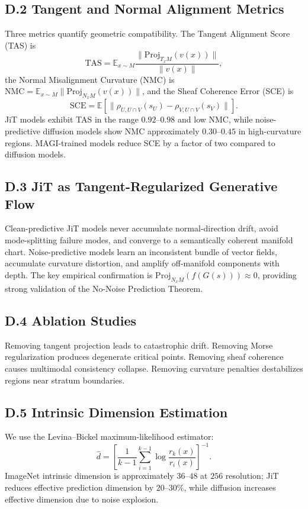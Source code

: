 \documentclass[11pt,a4paper,twocolumn]{article}
\begin{document}
\subsection*{D.2 Tangent and Normal Alignment Metrics}

Three metrics quantify geometric compatibility. The Tangent Alignment
Score (TAS) is
\[
\mathrm{TAS} =
\mathbb{E}_{x \sim M}
\frac{\| \mathrm{Proj}_{T_xM}(v(x)) \|}{\|v(x)\|},
\]
the Normal Misalignment Curvature (NMC) is
$\mathrm{NMC} = \mathbb{E}_{x \sim M}\| \mathrm{Proj}_{N_xM}(v(x)) \|$,
and the Sheaf Coherence Error (SCE) is
\[
\mathrm{SCE} =
\mathbb{E}\!\left[
\|\rho_{U,U\cap V}(s_U) - \rho_{V,U\cap V}(s_V)\|
\right].
\]
JiT models exhibit TAS in the range $0.92$--$0.98$ and low NMC, while
noise-predictive diffusion models show NMC approximately $0.30$--$0.45$
in high-curvature regions. MAGI-trained models reduce SCE by a factor
of two compared to diffusion models.

\subsection*{D.3 JiT as Tangent-Regularized Generative Flow}

Clean-predictive JiT models never accumulate normal-direction drift,
avoid mode-splitting failure modes, and converge to a semantically
coherent manifold chart. Noise-predictive models learn an inconsistent
bundle of vector fields, accumulate curvature distortion, and amplify
off-manifold components with depth. The key empirical confirmation is
$\mathrm{Proj}_{N_xM}(f(G(s))) \approx 0$, providing strong validation
of the No-Noise Prediction Theorem.

\subsection*{D.4 Ablation Studies}

Removing tangent projection leads to catastrophic drift. Removing Morse
regularization produces degenerate critical points. Removing sheaf
coherence causes multimodal consistency collapse. Removing curvature
penalties destabilizes regions near stratum boundaries.

\subsection*{D.5 Intrinsic Dimension Estimation}

We use the Levina--Bickel maximum-likelihood estimator:
\[
\widehat{d}
=
\left[
\frac{1}{k-1} \sum_{i=1}^{k-1}
\log\frac{r_k(x)}{r_i(x)}
\right]^{-1}.
\]
ImageNet intrinsic dimension is approximately $36$--$48$ at $256$
resolution; JiT reduces effective prediction dimension by $20$--$30\%$,
while diffusion increases effective dimension due to noise explosion.
\end{document}
